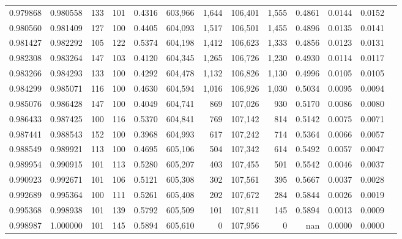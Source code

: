 \begin{tabular}{rrrrrrrrrrrrr}
0.979868 & 0.980558 &   133 & 101 &                                     0.4316 & 603,966 &   1,644 & 106,401 &   1,555 & 0.4861 & 0.0144 & 0.0152 \\
0.980560 & 0.981409 &   127 & 100 &                                     0.4405 & 604,093 &   1,517 & 106,501 &   1,455 & 0.4896 & 0.0135 & 0.0141 \\
0.981427 & 0.982292 &   105 & 122 &                                     0.5374 & 604,198 &   1,412 & 106,623 &   1,333 & 0.4856 & 0.0123 & 0.0131 \\
0.982308 & 0.983264 &   147 & 103 &                                     0.4120 & 604,345 &   1,265 & 106,726 &   1,230 & 0.4930 & 0.0114 & 0.0117 \\
0.983266 & 0.984293 &   133 & 100 &                                     0.4292 & 604,478 &   1,132 & 106,826 &   1,130 & 0.4996 & 0.0105 & 0.0105 \\
0.984299 & 0.985071 &   116 & 100 &                                     0.4630 & 604,594 &   1,016 & 106,926 &   1,030 & 0.5034 & 0.0095 & 0.0094 \\
0.985076 & 0.986428 &   147 & 100 &                                     0.4049 & 604,741 &     869 & 107,026 &     930 & 0.5170 & 0.0086 & 0.0080 \\
0.986433 & 0.987425 &   100 & 116 &                                     0.5370 & 604,841 &     769 & 107,142 &     814 & 0.5142 & 0.0075 & 0.0071 \\
0.987441 & 0.988543 &   152 & 100 &                                     0.3968 & 604,993 &     617 & 107,242 &     714 & 0.5364 & 0.0066 & 0.0057 \\
0.988549 & 0.989921 &   113 & 100 &                                     0.4695 & 605,106 &     504 & 107,342 &     614 & 0.5492 & 0.0057 & 0.0047 \\
0.989954 & 0.990915 &   101 & 113 &                                     0.5280 & 605,207 &     403 & 107,455 &     501 & 0.5542 & 0.0046 & 0.0037 \\
0.990923 & 0.992671 &   101 & 106 &                                     0.5121 & 605,308 &     302 & 107,561 &     395 & 0.5667 & 0.0037 & 0.0028 \\
0.992689 & 0.995364 &   100 & 111 &                                     0.5261 & 605,408 &     202 & 107,672 &     284 & 0.5844 & 0.0026 & 0.0019 \\
0.995368 & 0.998938 &   101 & 139 &                                     0.5792 & 605,509 &     101 & 107,811 &     145 & 0.5894 & 0.0013 & 0.0009 \\
0.998987 & 1.000000 &   101 & 145 &                                     0.5894 & 605,610 &       0 & 107,956 &       0 &    nan & 0.0000 & 0.0000 \\
\bottomrule
\end{tabular}
